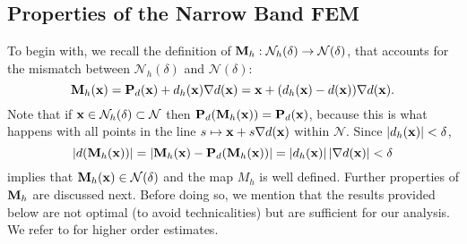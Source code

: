 \subsection{Properties of the Narrow Band FEM}

To begin with, we recall the definition of ${\bf M}_{h}: \mathcal N_h(\delta) \rightarrow \mathcal N(\delta)$, that accounts for the mismatch between $\mathcal N_h(\delta)$ and $\mathcal N(\delta)$:
%
\begin{equation}\label{e:narrow:rewrite_M}
{\bf M}_{h}({\bf x}) = {\bf P}_d({\bf x}) + d_h({\bf x}) \nabla d({\bf x}) = {\bf x} +(d_h({\bf x})-d({\bf x})) \nabla d({\bf x}).
\end{equation}
%
Note that if ${\bf x}\in{\mathcal{N}_h(\delta)}\subset\mathcal{N}$ then
${\bf P}_d({\bf M}_h({\bf x}))={\bf P}_d({\bf x})$, because this is what happens with all points in the line
$s\mapsto{\bf x}+s\nabla d({\bf x})$ within $\mathcal{N}$. Since $|d_h({\bf x})|<\delta$,
%
\[
|d({\bf M}_h({\bf x}))| = | {\bf M}_h({\bf x}) - {\bf P}_d({\bf M}_h({\bf x}))| = |d_h({\bf x})| \, |\nabla d({\bf x})|
< \delta
\]
implies that ${\bf M}_h({\bf x})\in{\mathcal{N}(\delta)}$ and the map $M_h$ is well defined.
Further properties of ${\bf M}_h$ are discussed next.
Before doing so, we mention that the results provided below are not optimal (to avoid technicalities) but are sufficient for our analysis.
We refer to \cite{MR3249369,MR3471100} for higher order estimates.

